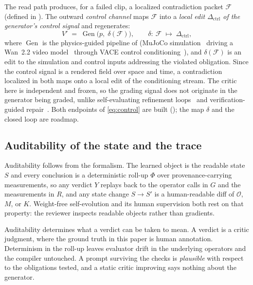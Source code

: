 The read path produces, for a failed clip, a localized contradiction packet $\mathcal{F}$
(defined in ). The outward
\emph{control channel} maps $\mathcal{F}$ into a \emph{local edit $\Delta_{\mathrm{ctrl}}$ of the
generator's control signal} and regenerates:
\begin{equation}
  V' \;=\; \operatorname{Gen}\!\big(p,\; \delta(\mathcal{F})\big),
  \qquad \delta:\ \mathcal{F} \;\longmapsto\; \Delta_{\mathrm{ctrl}},
  \label{eq:control}
\end{equation}
where $\operatorname{Gen}$ is the physics-guided pipeline of 
(MuJoCo simulation~\cite{todorov2012mujoco} driving a Wan~2.2 video
model~\cite{wan2025} through VACE control conditioning~\cite{vace2025}), and
$\delta(\mathcal{F})$ is an edit to the simulation and control inputs addressing the violated obligation.
Since the control signal is a rendered field over space and time, a contradiction localized in
both maps onto a local edit of the conditioning stream. The critic here is independent and
frozen, so the grading signal does not originate in the generator being graded, unlike
self-evaluating refinement loops~\cite{mavis2025} and verification-guided
repair~\cite{neuse2025}. Both endpoints of \eqref{eq:control} are built
(); the map $\delta$ and the closed loop are roadmap.

\subsection{Auditability of the state and the trace}
\label{sec:framework:audit}

Auditability follows from the formalism. The learned object is the readable state $S$ and every
conclusion is a deterministic roll-up $\Phi$ over provenance-carrying measurements, so any verdict
$Y$ replays back to the operator calls in $G$ and the measurements in $R$, and any state change
$S\!\rightarrow\!S'$ is a human-readable diff of $\mathcal{O}$, $M$, or $K$. Weight-free self-evolution and
its human supervision both rest on that property: the reviewer inspects readable objects rather
than gradients.

Auditability determines what a verdict can be taken to mean. A \supported{} verdict is a critic judgment, where the
ground truth in this paper is human annotation. Determinism in the roll-up leaves evaluator drift
in the underlying operators and the compiler untouched. A prompt surviving the checks is
\emph{plausible} with respect to the obligations tested, and a static critic improving says
nothing about the generator.

